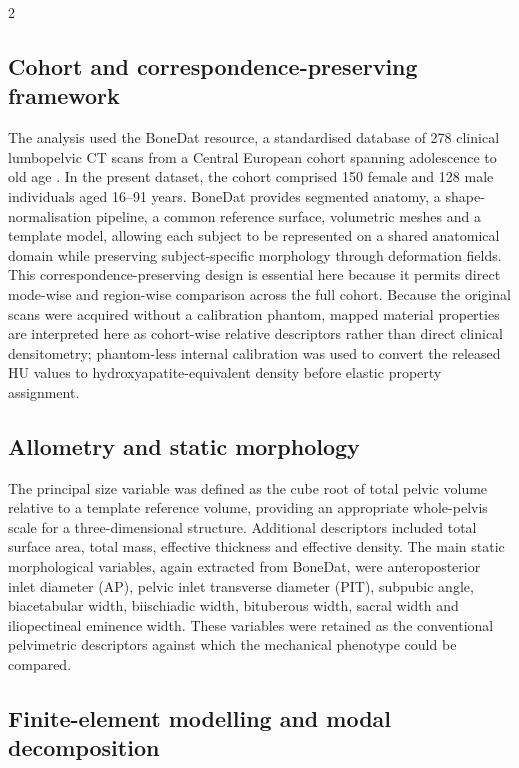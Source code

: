 \documentclass[openacc]{rsproca_new}
\begin{document}
\begin{multicols}{2}
\subsection{Cohort and correspondence-preserving framework}

The analysis used the BoneDat resource, a standardised database of 278 clinical lumbopelvic CT scans from a Central European cohort spanning adolescence to old age \cite{HenysKuchar2025}. In the present dataset, the cohort comprised 150 female and 128 male individuals aged 16--91 years. BoneDat provides segmented anatomy, a shape-normalisation pipeline, a common reference surface, volumetric meshes and a template model, allowing each subject to be represented on a shared anatomical domain while preserving subject-specific morphology through deformation fields. This correspondence-preserving design is essential here because it permits direct mode-wise and region-wise comparison across the full cohort. Because the original scans were acquired without a calibration phantom, mapped material properties are interpreted here as cohort-wise relative descriptors rather than direct clinical densitometry; phantom-less internal calibration was used to convert the released HU values to hydroxyapatite-equivalent density before elastic property assignment.

\subsection{Allometry and static morphology}

The principal size variable was defined as the cube root of total pelvic volume relative to a template reference volume, providing an appropriate whole-pelvis scale for a three-dimensional structure. Additional descriptors included total surface area, total mass, effective thickness and effective density. The main static morphological variables, again extracted from BoneDat, were anteroposterior inlet diameter (AP), pelvic inlet transverse diameter (PIT), subpubic angle, biacetabular width, biischiadic width, bituberous width, sacral width and iliopectineal eminence width. These variables were retained as the conventional pelvimetric descriptors against which the mechanical phenotype could be compared.

\subsection{Finite-element modelling and modal decomposition}


\end{multicols}
\end{document}

